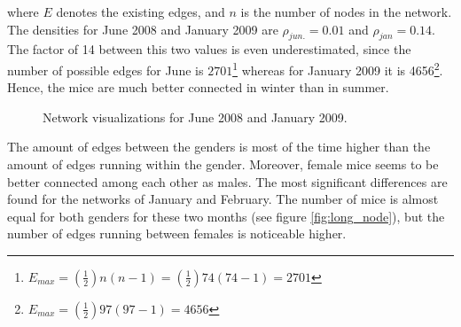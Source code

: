 where $E$ denotes the existing edges, and $n$ is the number of nodes in the network. The densities for June 2008 and January 2009 are $\rho_{jun.} = 0.01$ and $\rho_{jan} = 0.14$. The factor of 14 between this two values is even underestimated, since the number of possible edges for June is $2701$\footnote{$E_{max} = (\frac{1}{2})n(n-1) = (\frac{1}{2}) 74(74 -1) = 2701$} whereas for January 2009 it is 4656\footnote{$E_{max} = (\frac{1}{2}) 97(97-1)  = 4656$}. Hence, the mice are much better connected in winter than in summer.  

\begin{figure}[htpb]%
	\centering 
	
	\qquad 			
	\caption[Network visualizations for June 2008 and January 2009]{Network visualizations for June 2008 and January 2009.}
	 \label{fig:june_jan_side}
\end{figure} 

The amount of edges between the genders is most of the time higher than the amount of edges running within the gender. Moreover, female mice seems to be better connected among each other as males. The most significant differences are found for the networks of January and February. The number of mice is almost equal for both genders for these two months (see figure \ref{fig:long_node}), but the number of edges running between females is noticeable higher. 
      
